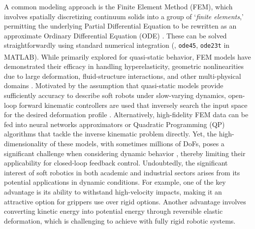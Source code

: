 A common modeling approach is the Finite Element Method (FEM), which involves spatially discretizing continuum solids into a group of `\textit{finite elements},'  permitting the underlying Partial Differential Equation to be rewritten as an approximate Ordinary Differential Equation (ODE) \cite{Holzapfel2002,Kim2018}. These can be solved straightforwardly using standard numerical integration (\eg, \texttt{ode45}, \texttt{ode23t} in MATLAB\textsuperscript{\scriptsize\textregistered}).
%
While primarily explored for quasi-static behavior, FEM models have demonstrated their efficacy in handling hyperelasticity, geometric nonlinearities due to large deformation, fluid-structure interactions, and other multi-physical domains \cite{Xavier2022Jun,Hughes2016Nov,Smith2022_FEM,Moerman2018,Maas2012}. Motivated by the assumption that quasi-static models provide sufficiently accuracy to describe soft robots under slow-varying dynamics, open-loop forward kinematic controllers are used that inversely search the input space for the desired deformation profile \cite{Marchese2015,Bern2019,Marchese2016}. Alternatively, high-fidelity FEM data can be fed into neural networks approximators \cite{Fang2022Jun,Zheng2020May} or Quadratic Programming (QP) algorithms \cite{Bern2019} that tackle the inverse kinematic problem directly. Yet, the high-dimensionality of these models, with sometimes millions of DoFs, poses a significant challenge when considering dynamic behavior \cite{Goury2018,Duriez2013}, thereby limiting their applicability for closed-loop feedback control. Undoubtedly, the significant interest of soft robotics in both academic and industrial sectors arises from its potential applications in dynamic conditions. For example, one of the key advantage is its ability to withstand high-velocity impacts, making it an attractive option for grippers use over rigid options. Another advantage involves converting kinetic energy into potential energy through reversible elastic deformation, which is challenging to achieve with fully rigid robotic systems.

